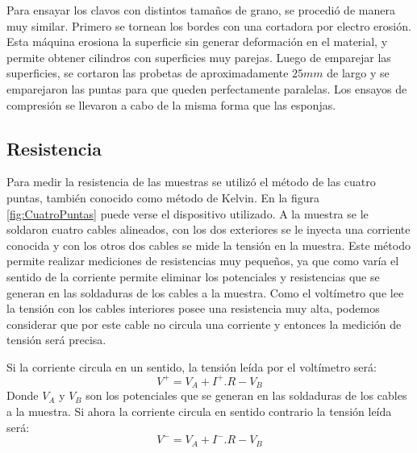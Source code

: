 \documentclass[a4paper,12pt,fleqn,twoside,openany]{book}
\begin{document}
 

Para ensayar los clavos con distintos tamaños de grano, se procedió de manera muy similar. Primero se tornean los bordes con una cortadora por electro erosión. Esta máquina erosiona la superficie sin generar deformación en el material, y permite obtener cilindros con superficies muy parejas. Luego de emparejar las superficies, se cortaron las probetas de aproximadamente $25 mm$ de largo y se emparejaron las puntas para que queden perfectamente paralelas. 
Los ensayos de compresión se llevaron a cabo de la misma forma que las esponjas. 
 

\subsection{Resistencia} \label{CuatroPuntas}


Para medir la resistencia de las muestras se utilizó el método de las cuatro puntas, también conocido como método de Kelvin. En la figura 
\ref{fig:CuatroPuntas} puede 
verse el dispositivo utilizado. A la muestra se le soldaron cuatro cables alineados, con los dos exteriores se le inyecta una corriente conocida y con los 
otros dos cables se mide la tensión en la muestra. Este método permite realizar mediciones de resistencias muy pequeños, ya que como varía
el sentido de la corriente permite eliminar los potenciales y resistencias que se generan en las soldaduras de los cables a la muestra.
Como el voltímetro que lee la tensión con los cables interiores posee una resistencia muy alta, podemos considerar que por este cable no circula una corriente
y entonces la medición de tensión será precisa. 

Si la corriente circula en un sentido, la tensión leída por el voltímetro será:
\begin{equation}
 V^+= V_A +I^+ . R - V_B 
\end{equation}
Donde $V_A$ y $V_B$ son los potenciales que se generan en las soldaduras de los cables a la muestra. Si ahora la corriente circula en sentido contrario la tensión leída será:
\begin{equation}
 V^-= V_A +I^- . R - V_B 
\end{equation}
\end{document}
